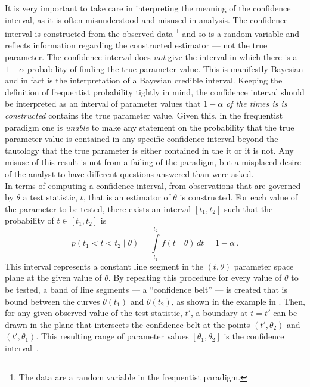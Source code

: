 It is very important to take care in interpreting the meaning of the confidence interval, as it is often misunderstood and misused in analysis.
The confidence interval is constructed from the observed data%
\footnote{The data are a random variable in the frequentist paradigm.}
and so is a random variable and reflects information regarding the constructed estimator --- not the true parameter.
The confidence interval does \emph{not} give the interval in which there is a $1-\alpha$ probability of finding the true parameter value.
This is manifestly Bayesian and in fact is the interpretation of a Bayesian credible interval.
Keeping the definition of frequentist probability tightly in mind, the confidence interval should be interpreted as an interval of parameter values that $1-\alpha$ \emph{of the times is is constructed} contains the true parameter value.
Given this, in the frequentist paradigm one is \emph{unable} to make any statement on the probability that the true parameter value is contained in any specific confidence interval beyond the tautology that the true parameter is either contained in the it or it is not.
Any misuse of this result is not from a failing of the paradigm, but a misplaced desire of the analyst to have different questions answered than were asked.\\

In terms of computing a confidence interval, from observations that are governed by $\theta$ a test statistic, $t$, that is an estimator of $\theta$ is constructed.
For each value of the parameter to be tested, there exists an interval $\left[t_{1}, t_{2}\right]$ such that the probability of $t \in \left[t_{1}, t_{2}\right]$ is
\begin{equation}
 p\left(t_{1} < t < t_{2}\middle|\theta\right) = \int\limits_{t_{1}}^{t_{2}} f\left(t\middle|\,\theta\right)\,dt = 1-\alpha\,.
 \label{eq:confidence_interval_coverage}
\end{equation}
This interval represents a constant line segment in the $\left(t, \theta\right)$ parameter space plane at the given value of $\theta$.
By repeating this procedure for every value of $\theta$ to be tested, a band of line segments --- a ``confidence belt'' --- is created that is bound between the curves $\theta\left(t_{1}\right)$ and $\theta\left(t_{2}\right)$, as shown in the example in .
Then, for any given observed value of the test statistic, $t'$, a boundary at $t = t'$ can be drawn in the plane that intersects the confidence belt at the points $\left(t', \theta_{2}\right)$ and $\left(t', \theta_{1}\right)$.
This resulting range of parameter values $\left[\theta_{1}, \theta_{2}\right]$ is the confidence interval~\cite{Cranmer:2015nia,PDG2018:Ch39}.\\

